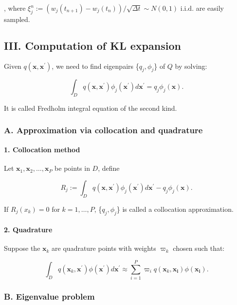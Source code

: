 \documentclass[
]{article}
\begin{document}
, where \(\xi^n_j:=(w_j(t_{n+1})-w_j(t_n))/\sqrt{\Delta t}\sim N(0,1)\)
i.i.d. are easily sampled.

\hypertarget{header-n139}{%
\subsection{III. Computation of KL expansion}\label{header-n139}}

Given \(q(\mathbf{x},\mathbf{x}^\prime)\), we need to find eigenpairs
\{\(q_{j},\phi_j\)\} of \(Q\) by solving:

\[\int_D q(\mathbf{x},\mathbf{x}^\prime)\phi_j(\mathbf{x^\prime})d\mathbf{x}^\prime=q_j\phi_j(\mathbf{x}).\]

It is called Fredholm integral equation of the second kind.

\hypertarget{header-n223}{%
\subsubsection{A. Approximation via collocation and
quadrature}\label{header-n223}}

\hypertarget{header-n154}{%
\paragraph{\texorpdfstring{ 1. Collocation
method}{ 1. Collocation method}}\label{header-n154}}

Let \(\mathbf{x}_1,\mathbf{x}_2,…,\mathbf{x}_{P}\) be points in \(
D\), define

\[R_j:=\int_D q(\mathbf{x},\mathbf{x}^\prime)\phi_j(\mathbf{x}^\prime)d\mathbf{x}^\prime-q_j\phi_j(\mathbf{x}).\]

If \(R_j(x_k)=0\) for \(k=1,…,P\), \{\(q_j,\phi_j\)\} is called a
collocation approximation.

\hypertarget{header-n170}{%
\paragraph{\texorpdfstring{ 2.
Quadrature}{ 2. Quadrature}}\label{header-n170}}

Suppose the \(\mathbf{x}_k\) are quadrature points with weights
\(\varpi_k\) chosen such that:

\[\int_D q(\mathbf{x}_k,\mathbf{x^\prime})\phi(\mathbf{x^\prime})d\mathbf{x^\prime}\approx \sum^{P}_{i=1}\varpi_iq(\mathbf{x}_k,\mathbf{x_i})\phi(\mathbf{x_i}).\]

\hypertarget{header-n163}{%
\subsubsection{\texorpdfstring{ B. Eigenvalue
problem}{ B. Eigenvalue problem}}\label{header-n163}}
\end{document}
